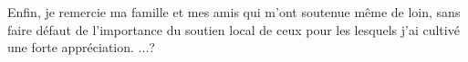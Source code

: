 \documentclass[a4paper,12pt,bibliography=totoc,index=totoc,twoside,francais]{scrbook}
\let\Oldgls\gls%
\renewcommand{\gls}[1]{%
\textbf{\Oldgls{#1}}%
}
\begin{document}
Enfin, je remercie ma famille et mes amis qui m'ont soutenue même de loin, sans faire défaut de l'importance du soutien local de ceux pour les lesquels j'ai cultivé une forte appréciation. ...?


\tableofcontents
\listoftables
\listoffigures

\mainmatter




%





%
%

\backmatter

\printindex

\glsaddall

\printglossary[type=acronym,title=Acronymes,toctitle=Acronymes]
\printglossary[type=main,title=Glossaire,toctitle=Glossaire]

\printbibliography

\cleardoublepage

\end{document}
